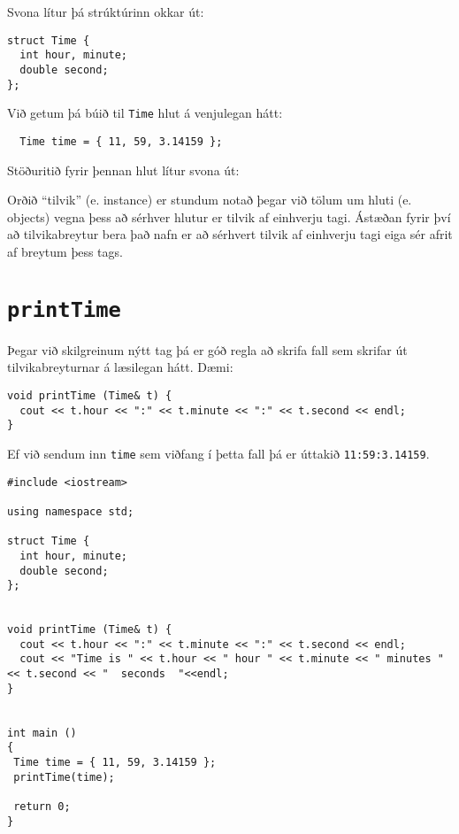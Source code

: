 Svona lítur þá strúktúrinn okkar út: 

\begin{verbatim}
struct Time {
  int hour, minute;
  double second;
};
\end{verbatim}
%
Við getum þá búið til {\tt Time} hlut á venjulegan hátt: 

\begin{verbatim}
  Time time = { 11, 59, 3.14159 };
\end{verbatim}
%
Stöðuritið fyrir þennan hlut lítur svona út:

\vspace{0.1in}
\centerline{}
\vspace{0.1in}

Orðið ``tilvik'' (e. instance) er stundum notað þegar við tölum um hluti (e. objects) vegna þess að sérhver hlutur er tilvik af einhverju tagi.
Ástæðan fyrir því að tilvikabreytur bera það nafn er að sérhvert tilvik af einhverju tagi eiga sér afrit af breytum þess tags.

\section{{\tt printTime}}
\label{printobject}

Þegar við skilgreinum nýtt tag þá er góð regla að skrifa fall sem skrifar út tilvikabreyturnar á læsilegan hátt.
Dæmi:

\begin{verbatim}
void printTime (Time& t) {
  cout << t.hour << ":" << t.minute << ":" << t.second << endl;
}
\end{verbatim}
%
Ef við sendum inn {\tt time} sem viðfang í þetta fall þá er úttakið {\tt 11:59:3.14159}.

\begin{verbatim}
#include <iostream>

using namespace std;

struct Time {
  int hour, minute;
  double second;
};


void printTime (Time& t) {
  cout << t.hour << ":" << t.minute << ":" << t.second << endl;
  cout << "Time is " << t.hour << " hour " << t.minute << " minutes " << t.second << "  seconds  "<<endl;
}


int main ()
{
 Time time = { 11, 59, 3.14159 };
 printTime(time);
 
 return 0;
}
\end{verbatim}
%

